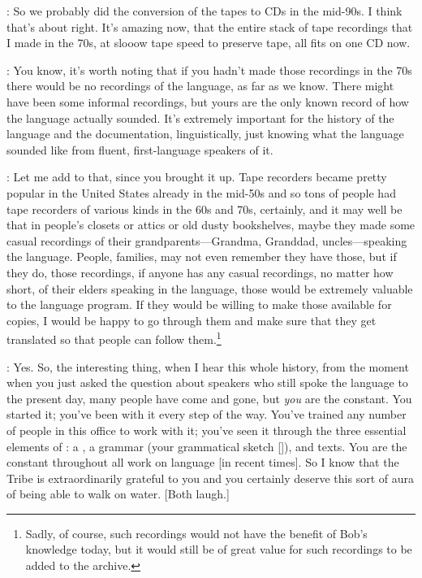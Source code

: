 \documentclass[output=paper]{LSP/langsci}
\begin{document}
: So we probably did the conversion of the tapes to CDs in the mid-90s. I think that's about right. It's amazing now, that the entire stack of tape recordings that I made in the 70s, at slooow tape speed to preserve tape, all fits on one CD now.

: You know, it's worth noting that if you hadn't made those recordings in the 70s there would be no recordings of the  language, as far as we know. There might have been some informal recordings, but yours are the only known record of how the language actually sounded. It's extremely important for the history of the  language and the documentation, linguistically, just knowing what the language sounded like from fluent, first-language speakers of it.

: Let me add to that, since you brought it up. Tape recorders became pretty popular in the United States already in the mid-50s and so tons of people had tape recorders of various kinds in the 60s and 70s, certainly, and it may well be that in people's closets or attics or old dusty bookshelves, maybe they made some casual recordings of their grandparents---Grandma, Granddad, uncles---speaking the  language. People, families, may not even remember they have those, but if they do, those recordings, if anyone has any casual recordings, no matter how short, of their elders speaking in the  language, those would be extremely valuable to the language program. If they would be willing to make those available for copies, I would be happy to go through them and make sure that they get translated so that people can follow them.\footnote{Sadly, of course, such recordings would not have the benefit of Bob's knowledge today, but it would still be of great value for such recordings to be added to the archive.}

: Yes. So, the interesting thing, when I hear this whole history, from the moment when you just asked the question about speakers who still spoke the language to the present day, many people have come and gone, but \textit{you} are the constant. You started it; you've been with it every step of the way. You've trained any number of people in this office to work with it; you've seen it through the three essential elements of : a , a grammar (your grammatical sketch [\citealt{Rankin1989}]), and texts. You are the constant throughout all work on  language [in recent times]. So I know that the Tribe is extraordinarily grateful to you and you certainly deserve this sort of aura of being able to walk on water. [Both laugh.]
\end{document}
